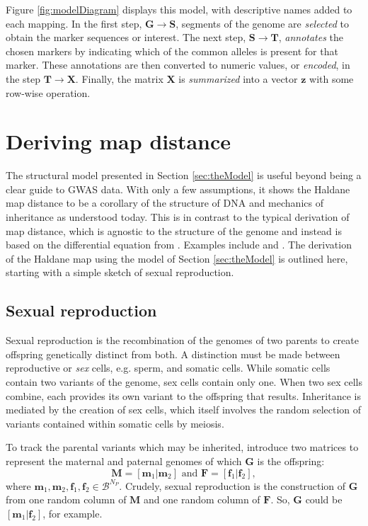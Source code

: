 \documentclass[sts]{imsart}
\newcommand{\ve}[1]{\mathbf{#1}}           %
\newcommand{\m}[1]{\mathbf{#1}}               %
\begin{document}
Figure \ref{fig:modelDiagram} displays this model, with descriptive names added to each mapping. In the first step, $\m{G} \rightarrow \m{S}$, segments of the genome are \textit{selected} to obtain the marker sequences or interest. The next step, $\m{S} \rightarrow \m{T}$, \textit{annotates} the chosen markers by indicating which of the common alleles is present for that marker. These annotations are then converted to numeric values, or \textit{encoded}, in the step $\m{T} \rightarrow \m{X}$. Finally, the matrix $\m{X}$ is \textit{summarized} into a vector $\ve{z}$ with some row-wise operation.


\section{Deriving map distance} \label{sec:derivingDists}

The structural model presented in Section \ref{sec:theModel} is useful beyond being a clear guide to GWAS data. With only a few assumptions, it shows the Haldane map distance to be a corollary of the structure of DNA and mechanics of inheritance as understood today. This is in contrast to the typical derivation of map distance, which is agnostic to the structure of the genome and instead is based on the differential equation from \cite{haldane1919}. Examples include \cite{kosambi1943estimation} and \cite{xu2013principles}. The derivation of the Haldane map using the model of Section \ref{sec:theModel} is outlined here, starting with a simple sketch of sexual reproduction.

\subsection{Sexual reproduction} \label{subsec:crossingover}

Sexual reproduction is the recombination of the genomes of two parents to create offspring genetically distinct from both. A distinction must be made between reproductive or \emph{sex} cells, e.g. sperm, and somatic cells. While somatic cells contain two variants of the genome, sex cells contain only one. When two sex cells combine, each provides its own variant to the offspring that results. Inheritance is mediated by the creation of sex cells, which itself involves the random selection of variants contained within somatic cells by meiosis.

To track the parental variants which may be inherited, introduce two matrices to represent the maternal and paternal genomes of which $\m{G}$ is the offspring:
$$\m{M} = [\ve{m}_1| \ve{m}_2] \text{ and } \m{F} = [\ve{f}_1| \ve{f}_2],$$
where $\ve{m}_1, \ve{m}_2, \ve{f}_1, \ve{f}_2 \in \mathcal{B}^{N_P}$. Crudely, sexual reproduction is the construction of $\m{G}$ from one random column of $\m{M}$ and one random column of $\m{F}$. So, $\m{G}$ could be $[\ve{m}_1 | \ve{f}_2]$, for example.
\end{document}
